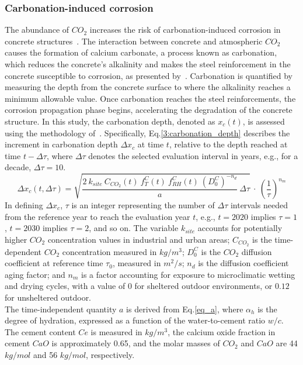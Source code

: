 \subsubsection{Carbonation-induced corrosion}\label{Carbonation_corrosion_Chpt}
The abundance of $CO_2$ increases the risk of carbonation-induced corrosion in concrete structures~\cite{TALUKDAR_part1,TALUKDAR_part2}. 
The interaction between concrete and atmospheric $CO_2$ causes the formation of calcium carbonate, a process known as carbonation, which reduces the concrete's alkalinity and makes the steel reinforcement in the concrete susceptible to corrosion, as presented by~\textcite{GLASSER2008226}.
Carbonation is quantified by measuring the depth from the concrete surface to where the alkalinity reaches a minimum allowable value. 
Once carbonation reaches the steel reinforcements, the corrosion propagation phase begins, accelerating the degradation of the concrete structure.
In this study, the carbonation depth, denoted as $x_c(t)$, is assessed using the methodology of~\textcite{Carb_eq_STEWART,Carb_eq_BASTIDASARTEAGA}.
Specifically, Eq.\ref{3:carbonation_depth} describes the increment in carbonation depth $\Delta x_c$ at time $t$, relative to the depth reached at time $t-\Delta \tau$, where $\Delta \tau$ denotes the selected evaluation interval in years, e.g., for a decade, $\Delta \tau = 10$.
\begin{equation}
    \label{3:carbonation_depth}
    \Delta x_c(t, \Delta \tau) = \sqrt{\frac{2 \ k_{site} \ C_{CO_2}(t) \ f_T^C(t) \ f_{RH}^C(t) \ (D_0^C)^{-n_d}}{a} \ \Delta \tau} \ \cdot \ \left( \frac{1}{\tau} \right)^{n_m} 
\end{equation}
In defining $\Delta x_c$, $\tau$ is an integer representing the number of $\Delta \tau$ intervals needed from the reference year to reach the evaluation year $t$, e.g., $t = 2020$ implies $\tau = 1$, $t = 2030$ implies $\tau = 2$, and so on.
The variable $k_{site}$ accounts for potentially higher $CO_2$ concentration values in industrial and urban areas; $C_{CO_2}$ is the time-dependent $CO_2$ concentration measured in $kg / m^3$; $D_0^C$ is the $CO_2$ diffusion coefficient at reference time $\tau_0$, measured in $m^2 / s$; $n_d$ is the diffusion coefficient aging factor; and $n_m$ is a factor accounting for exposure to microclimatic wetting and drying cycles, with a value of $0$ for sheltered outdoor environments, or $0.12$ for unsheltered outdoor. \\
The time-independent quantity $a$ is derived from Eq.\ref{eq_a}, where $\alpha_h$ is the degree of hydration, expressed as a function of the water-to-cement ratio $w / c$. The cement content $Ce$ is measured in $kg / m^3$, the calcium oxide fraction in cement $CaO$ is approximately 0.65, and the molar masses of $CO_2$ and $CaO$ are 44 $kg/mol$ and 56 $kg/mol$, respectively.
